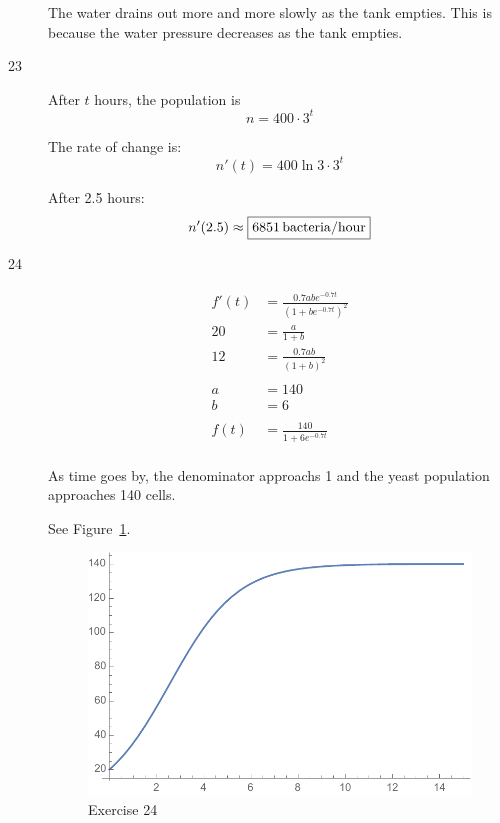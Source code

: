 \documentclass[letterpaper, landscape]{exam}
\begin{document}
\begin{description}
      The water drains out more and more slowly as the tank empties. This is because
      the water pressure decreases as the tank empties.

    \newpage

    \item[23]
      After $t$ hours, the population is 
      \[
        n = 400 \cdot 3^t 
      \]

      The rate of change is:
      \[
        n'(t) = 400 \ln 3 \cdot 3^t
      \]

      After 2.5 hours:
      \[
        n'(2.5) \approx \boxed{ \unit[6851]{bacteria/hour} }
      \]

    \item[24]
      \begin{align*}
        f'(t) &= \frac{0.7abe^{ - 0.7 t}}{\left( 1 + be^{ - 0.7 t} \right)^2}
        \\
        20 &= \frac{a}{1 + b} \\
        12 &= \frac{0.7 ab}{\left( 1 + b \right)^2} \\
        \\
        a &= 140 \\
        b &= 6 \\
        \\
        f(t) &= \frac{140}{1 + 6 e^{-0.7t}} \\
      \end{align*}

      As time goes by, the denominator approachs 1 and the yeast population approaches 140 cells. 
      
      See Figure~\ref{fig:ex24}.

      \begin{figure}[H]
        \centering
        \includegraphics[scale = 0.5]{ex24}
        \caption{Exercise 24}
        \label{fig:ex24}
      \end{figure}



\end{description}
\end{document}
